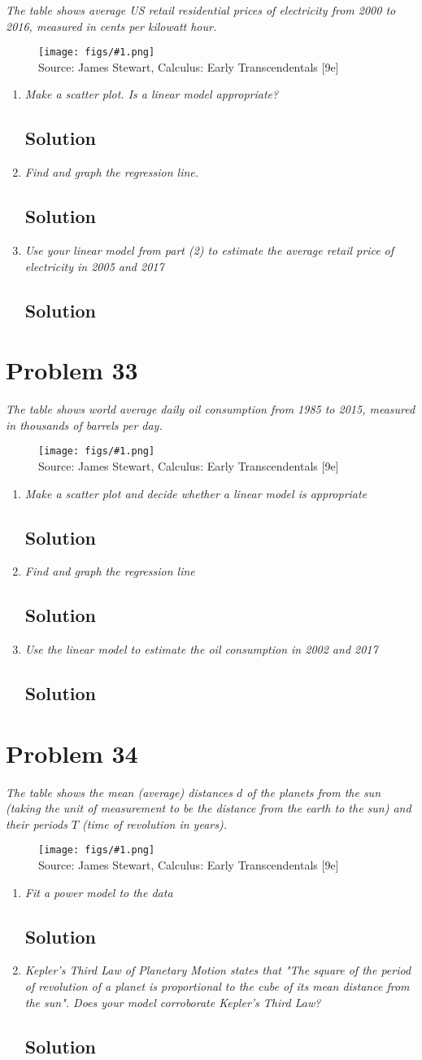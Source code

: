 \documentclass[11pt]{article}
\newcommand{\soln}{\subsection*}
\newcommand{\qn}{\textit}
\newcommand{\imagesource}[1]{{\footnotesize Source: #1}}
\newcommand{\imgqn}[1]{
	\begin{figure}[H]
		\centering
		\texttt{[image: figs/\#1.png]}\\
		\imagesource{James Stewart, Calculus: Early Transcendentals [9e]}
	\end{figure}
}
\begin{document}
\qn{The table shows average US retail residential prices of electricity from 2000 to 2016, measured in cents per kilowatt hour.}

\imgqn{1.2.32}

\begin{enumerate}
	\item \qn{Make a scatter plot. Is a linear model appropriate?}
	\soln{Solution}
	
	\item \qn{Find and graph the regression line.}
	\soln{Solution}
	
	\item \qn{Use your linear model from part (2) to estimate the average retail price of electricity in 2005 and 2017}
	\soln{Solution}
\end{enumerate}

\section*{Problem 33}

\qn{The table shows world average daily oil consumption from 1985 to 2015, measured in thousands of barrels per day.}

\imgqn{1.2.33}

\begin{enumerate}
	\item \qn{Make a scatter plot and decide whether a linear model is appropriate}
	\soln{Solution}
	
	\item \qn{Find and graph the regression line}
	\soln{Solution}
	
	\item \qn{Use the linear model to estimate the oil consumption in 2002 and 2017}
	\soln{Solution}
\end{enumerate}

\section*{Problem 34}

\qn{The table shows the mean (average) distances $d$ of the planets from the sun (taking the unit of measurement to be the distance from the earth to the sun) and their periods $T$ (time of revolution in years).}

\imgqn{1.2.34}

\begin{enumerate}
	\item \qn{Fit a power model to the data}
	\soln{Solution}
	
	\item \qn{Kepler's Third Law of Planetary Motion states that "The square of the period of revolution of a planet is proportional to the cube of its mean distance from the sun". Does your model corroborate Kepler's Third Law?}
	\soln{Solution}
\end{enumerate}
\end{document}

